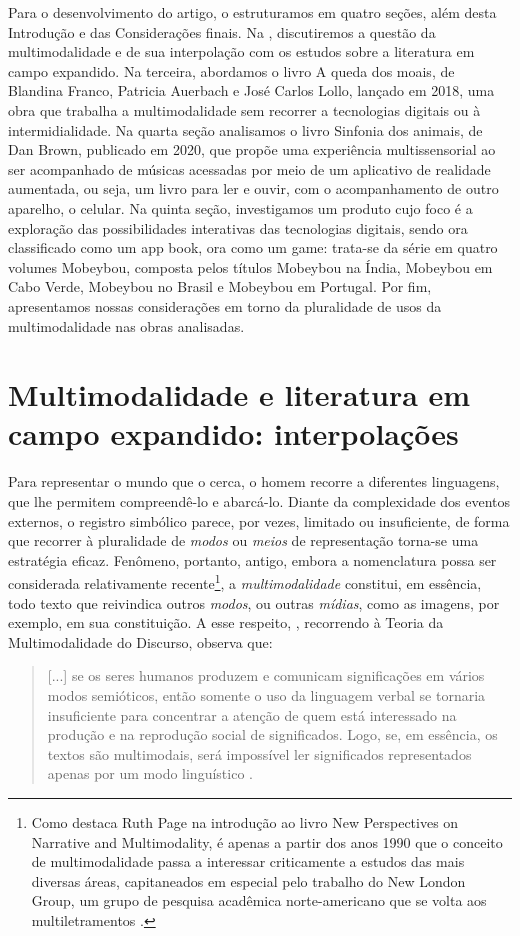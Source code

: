 \documentclass[portuguese]{textolivre}
\begin{document}
Para o desenvolvimento do artigo, o estruturamos em quatro seções, além desta
Introdução e das Considerações finais. Na , discutiremos a
questão da multimodalidade e de sua interpolação com os estudos sobre a
literatura em campo expandido. Na terceira, abordamos o livro A queda dos
moais, de Blandina Franco, Patricia Auerbach e José Carlos Lollo, lançado em
2018, uma obra que trabalha a multimodalidade sem recorrer a tecnologias
digitais ou à intermidialidade. Na quarta seção analisamos o livro Sinfonia dos
animais, de Dan Brown, publicado em 2020, que propõe uma experiência
multissensorial ao ser acompanhado de músicas acessadas por meio de um
aplicativo de realidade aumentada, ou seja, um livro para ler e ouvir, com o
acompanhamento de outro aparelho, o celular. Na quinta seção, investigamos um
produto cujo foco é a exploração das possibilidades interativas das tecnologias
digitais, sendo ora classificado como um app book, ora como um game: trata-se
da série em quatro volumes Mobeybou, composta pelos títulos Mobeybou na Índia,
Mobeybou em Cabo Verde, Mobeybou no Brasil e Mobeybou em Portugal. Por fim,
apresentamos nossas considerações em torno da pluralidade de usos da
multimodalidade nas obras analisadas.

\section{Multimodalidade e literatura em campo expandido: interpolações}\label{sec-normas}

Para representar o mundo que o cerca, o homem recorre a diferentes linguagens,
que lhe permitem compreendê-lo e abarcá-lo. Diante da complexidade dos eventos
externos, o registro simbólico parece, por vezes, limitado ou insuficiente, de
forma que recorrer à pluralidade de \textit{modos} ou \textit{meios} de
representação torna-se uma estratégia eficaz. Fenômeno, portanto, antigo,
embora a nomenclatura possa ser considerada relativamente recente\footnote{
    Como destaca Ruth Page na introdução ao livro New Perspectives on Narrative
    and Multimodality, é apenas a partir dos anos 1990 que o conceito de
    multimodalidade passa a interessar criticamente a estudos das mais diversas
    áreas, capitaneados em especial pelo trabalho do New London Group, um grupo de
    pesquisa acadêmica norte-americano que se volta aos multiletramentos
    \cite[p.~3-5]{page_new_2010}.},
a \textit{multimodalidade} constitui, em
essência, todo texto que reivindica outros \textit{modos}, ou outras
\textit{mídias}, como as imagens, por exemplo, em sua constituição. A esse
respeito, \textcite{vieira_multimodalidade_2015}, recorrendo à Teoria da
Multimodalidade do Discurso, observa que:
\begin{quote}
    [...] se os seres humanos produzem e comunicam significações em vários
    modos semióticos, então somente o uso da linguagem verbal se tornaria
    insuficiente para concentrar a atenção de quem está interessado na produção
    e na reprodução social de significados. Logo, se, em essência, os textos
    são multimodais, será impossível ler significados representados apenas por
    um modo linguístico \cite[p.~44]{vieira_multimodalidade_2015}.
\end{quote}
\end{document}
